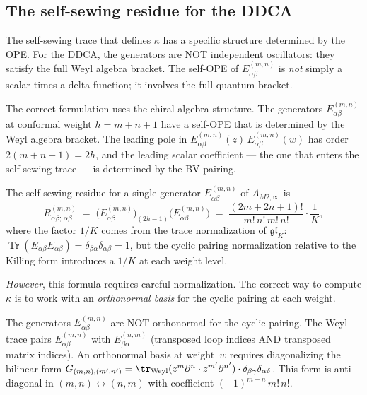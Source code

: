 \documentclass[11pt]{article}
\newcommand{\Tr}{\operatorname{Tr}}
\begin{document}
\subsection{The self-sewing residue for the DDCA}

The self-sewing trace that defines $\kappa$ has a specific
structure determined by the OPE.  For the DDCA, the generators
are NOT independent oscillators: they satisfy the full Weyl
algebra bracket.  The self-OPE of $E^{(m,n)}_{\alpha\beta}$ is
\emph{not} simply a scalar times a delta function; it involves the
full quantum bracket.

The correct formulation uses the chiral algebra structure.  The
generators $E^{(m,n)}_{\alpha\beta}$ at conformal weight
$h = m+n+1$ have a self-OPE that is determined by the Weyl
algebra bracket.  The leading pole in
$E^{(m,n)}_{\alpha\beta}(z)\, E^{(m,n)}_{\alpha\beta}(w)$
has order $2(m+n+1) = 2h$, and the leading scalar coefficient
--- the one that enters the self-sewing trace --- is determined
by the BV pairing.

\begin{proposition}
\label{prop:m2-self-sewing}
The self-sewing residue for a single generator
$E^{(m,n)}_{\alpha\beta}$ of $A_{M2,\infty}$ is
\begin{equation}\label{eq:m2-self-sewing-single}
R^{(m,n)}_{\alpha\beta;\,\alpha\beta}
\;=\;
\bigl(E^{(m,n)}_{\alpha\beta}\bigr)_{(2h-1)}
\bigl(E^{(m,n)}_{\alpha\beta}\bigr)
\;=\;
\frac{(2m+2n+1)!}{m!\,n!\,m!\,n!}\cdot\frac{1}{K},
\end{equation}
where the factor $1/K$ comes from the trace normalization
of $\mathfrak{gl}_K$:
$\Tr(E_{\alpha\beta}E_{\alpha\beta})
= \delta_{\beta\alpha}\delta_{\alpha\beta} = 1$,
but the cyclic pairing normalization relative to the Killing
form introduces a $1/K$ at each weight level.

\emph{However}, this formula requires careful normalization.
The correct way to compute $\kappa$ is to work with an
\emph{orthonormal basis} for the cyclic pairing at each weight.
\end{proposition}

\begin{warning}
\label{warn:orthogonalization}
The generators $E^{(m,n)}_{\alpha\beta}$ are NOT orthonormal for
the cyclic pairing.  The Weyl trace pairs
$E^{(m,n)}_{\alpha\beta}$ with
$E^{(n,m)}_{\beta\alpha}$ (transposed loop indices AND
transposed matrix indices).  An orthonormal basis at weight~$w$
requires diagonalizing the bilinear form
$G_{(m,n),(m',n')} =
\tr_{\mathrm{Weyl}}(z^m\partial^n \cdot z^{m'}\partial^{n'})
\cdot \delta_{\beta\gamma}\delta_{\alpha\delta}$.
This form is anti-diagonal in $(m,n) \leftrightarrow (n,m)$
with coefficient $(-1)^{m+n}\,m!\,n!$.
\end{warning}
\end{document}
